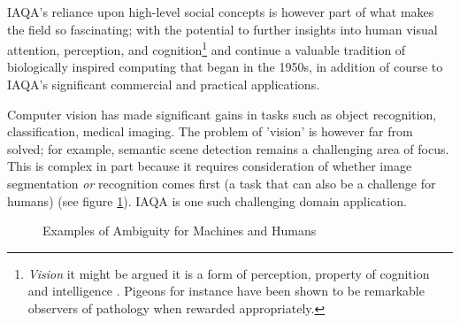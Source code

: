 \newpage

IAQA's reliance upon high-level social concepts\cite{Datta2006} is however part of what makes the field so fascinating; with the potential to further insights into human visual attention, perception, and cognition\footnote{\textit{Vision} it might be argued it is a form of perception, property of cognition and intelligence\cite{russell2016artificial} . Pigeons for instance have been shown to be remarkable observers of pathology \cite{Levenson2015} when rewarded appropriately.
} and continue a valuable tradition of biologically inspired computing\cite{Hassabis2017} that began in the 1950s, in addition of course to IAQA's significant commercial and practical applications. 

\par 
Computer vision has made significant gains in tasks such as object recognition, classification, medical imaging\cite{Esteva2021}.  The problem of 'vision' is however far from solved; for example, semantic scene detection remains a challenging area of focus. This is complex in part because it requires consideration of whether image segmentation \textit{or} recognition comes first\cite{Kreiman2021} (a task that can also be a challenge for humans) (see figure \ref{fig:vase_face}). IAQA is one such challenging domain application.\par



\begin{figure}[h!]
    \centering
    \caption{Examples of Ambiguity for Machines and Humans}
    \label{fig:vase_face}
\end{figure}

